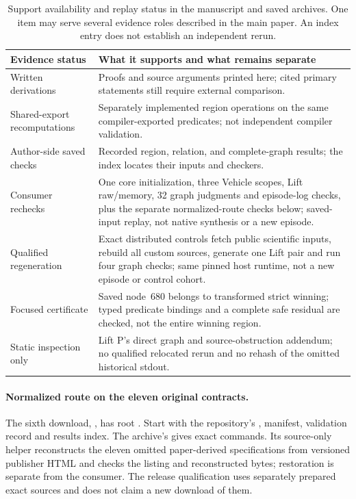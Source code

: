 \begin{table}[ht]
\centering\small
\caption{Support availability and replay status in the manuscript and saved archives. One item may serve several evidence roles described in the main paper. An index entry does not establish an independent rerun.}
\begin{tabular}{@{}p{28mm}p{112mm}@{}}
\toprule
Evidence status & What it supports and what remains separate\\
\midrule
Written derivations & Proofs and source arguments printed here; cited primary statements still require external comparison.\\
Shared-export recomputations & Separately implemented region operations on the same compiler-exported predicates; not independent compiler validation.\\
Author-side saved checks & Recorded region, relation, and complete-graph results; the index locates their inputs and checkers.\\
Consumer rechecks & One core initialization, three Vehicle scopes, Lift raw/memory, 32 graph judgments and episode-log checks, plus the separate normalized-route checks below; saved-input replay, not native synthesis or a new episode.\\
Qualified regeneration & Exact distributed controls fetch public scientific inputs, rebuild all custom sources, generate one Lift pair and run four graph checks; same pinned host runtime, not a new episode or control cohort.\\
Focused certificate & Saved node~680 belongs to transformed strict winning; typed predicate bindings and a complete safe residual are checked, not the entire winning region.\\
Static inspection only & Lift P's direct graph and source-obstruction addendum; no qualified relocated rerun and no rehash of the omitted historical stdout.\\
\bottomrule
\end{tabular}
\end{table}

\paragraph{Normalized route on the eleven original contracts.}
The sixth download,
, has root
.
Start with the repository's , manifest,
validation record and results index. The archive's 
gives exact commands. Its source-only helper reconstructs the eleven
omitted paper-derived specifications from versioned publisher HTML and
checks the listing and reconstructed bytes; restoration is separate from the consumer.
The release qualification uses separately prepared exact sources and
does not claim a new download of them.

